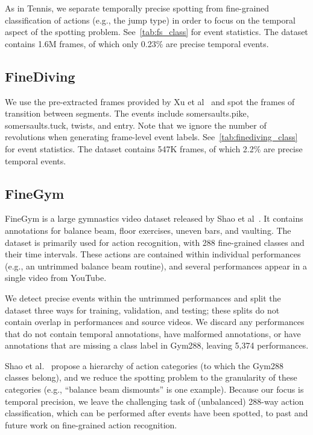\documentclass[runningheads]{llncs}
\newcommand{\finegym}{{FineGym}\xspace}
\begin{document}
As in Tennis, we separate temporally precise spotting from fine-grained classification of actions (e.g., the jump type) in order to focus on the temporal aspect of the spotting problem.
See~\autoref{tab:fs_class} for event statistics.
The dataset contains 1.6M frames, of which only 0.23\% are precise temporal events.

\subsection{FineDiving}

We use the pre-extracted frames provided by Xu et al~\cite{finediving} and spot the frames of transition between segments.
The events include somersaults.pike, somersaults.tuck, twists, and entry.
Note that we ignore the number of revolutions when generating frame-level event labels.
See~\autoref{tab:finediving_class} for event statistics.
The dataset contains 547K frames, of which 2.2\% are precise temporal events.

\subsection{FineGym}

\finegym is a large gymnastics video dataset released by Shao et al~\cite{finegym}.
It contains annotations for balance beam, floor exercises, uneven bars, and vaulting.
The dataset is primarily used for action recognition, with 288 fine-grained classes and their time intervals.
These actions are contained within individual performances (e.g., an untrimmed balance beam routine), and several performances appear in a single video from YouTube.

We detect precise events within the untrimmed performances and split the dataset three ways for training, validation, and testing; these splits do not contain overlap in performances and source videos.
We discard any performances that do not contain temporal annotations, have malformed annotations, or have annotations that are missing a class label in Gym288, leaving 5,374 performances.

Shao et al.~\cite{finegym} propose a hierarchy of action categories (to which the Gym288 classes belong), and we reduce the spotting problem to the granularity of these categories (e.g., ``balance beam dismounts'' is one example).
Because our focus is temporal precision, we leave the challenging task of (unbalanced) 288-way action classification, which can be performed after events have been spotted, to past and future work on fine-grained action recognition.
\end{document}
